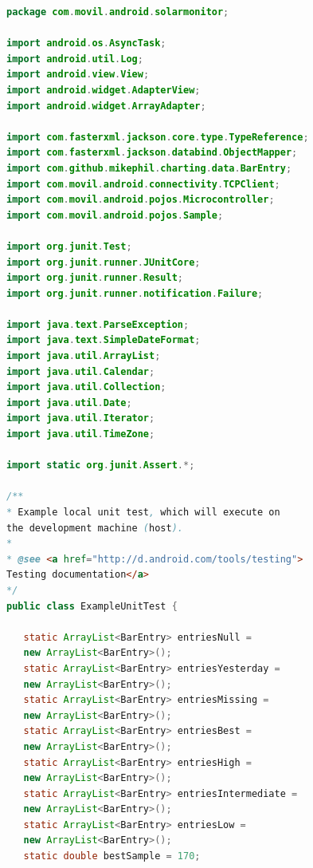 \begin{lstlisting}[language= Java, frame=single]
package com.movil.android.solarmonitor;

import android.os.AsyncTask;
import android.util.Log;
import android.view.View;
import android.widget.AdapterView;
import android.widget.ArrayAdapter;

import com.fasterxml.jackson.core.type.TypeReference;
import com.fasterxml.jackson.databind.ObjectMapper;
import com.github.mikephil.charting.data.BarEntry;
import com.movil.android.connectivity.TCPClient;
import com.movil.android.pojos.Microcontroller;
import com.movil.android.pojos.Sample;

import org.junit.Test;
import org.junit.runner.JUnitCore;
import org.junit.runner.Result;
import org.junit.runner.notification.Failure;

import java.text.ParseException;
import java.text.SimpleDateFormat;
import java.util.ArrayList;
import java.util.Calendar;
import java.util.Collection;
import java.util.Date;
import java.util.Iterator;
import java.util.TimeZone;

import static org.junit.Assert.*;

/**
* Example local unit test, which will execute on
the development machine (host).
*
* @see <a href="http://d.android.com/tools/testing">
Testing documentation</a>
*/
public class ExampleUnitTest {

   static ArrayList<BarEntry> entriesNull =
   new ArrayList<BarEntry>();
   static ArrayList<BarEntry> entriesYesterday = 
   new ArrayList<BarEntry>();
   static ArrayList<BarEntry> entriesMissing = 
   new ArrayList<BarEntry>();
   static ArrayList<BarEntry> entriesBest = 
   new ArrayList<BarEntry>();
   static ArrayList<BarEntry> entriesHigh = 
   new ArrayList<BarEntry>();
   static ArrayList<BarEntry> entriesIntermediate = 
   new ArrayList<BarEntry>();
   static ArrayList<BarEntry> entriesLow = 
   new ArrayList<BarEntry>();
   static double bestSample = 170;


\end{lstlisting}
